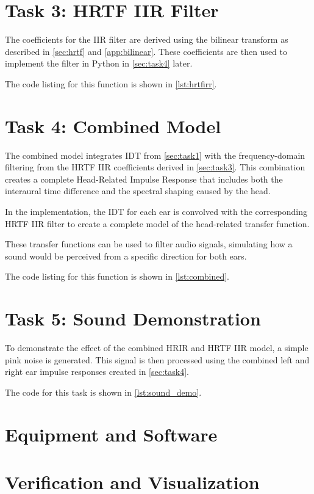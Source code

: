 \section{Task 3: HRTF IIR Filter}
\label{sec:task3}

The coefficients for the IIR filter are derived using the bilinear transform as described in \autoref{sec:hrtf} and \autoref{app:bilinear}. These coefficients are then used to implement the filter in Python in \autoref{sec:task4} later.

The code listing for this function is shown in \autoref{lst:hrtfirr}.

\section{Task 4: Combined Model}
\label{sec:task4}

The combined model integrates IDT from \autoref{sec:task1} with the frequency-domain filtering from the HRTF IIR coefficients derived in \autoref{sec:task3}. This combination creates a complete Head-Related Impulse Response that includes both the interaural time difference and the spectral shaping caused by the head.

In the implementation, the IDT for each ear is convolved with the corresponding HRTF IIR filter to create a complete model of the head-related transfer function.

These transfer functions can be used to filter audio signals, simulating how a sound would be perceived from a specific direction for both ears.

The code listing for this function is shown in \autoref{lst:combined}.

\section{Task 5: Sound Demonstration}
\label{sec:task5}

To demonstrate the effect of the combined HRIR and HRTF IIR model, a simple pink noise is generated. This signal is then processed using the combined left and right ear impulse responses created in \autoref{sec:task4}.

The code for this task is shown in \autoref{lst:sound_demo}.

\section{Equipment and Software}
\label{sec:equipment_software}



\section{Verification and Visualization}
